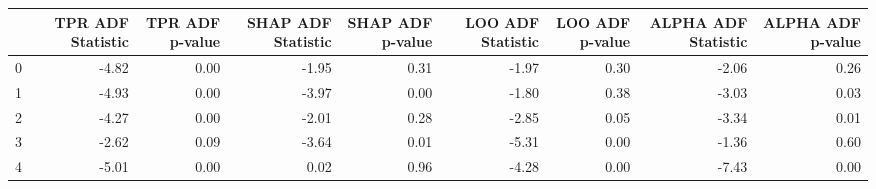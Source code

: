 \begin{tabular}{lrrrrrrrr}
\toprule
 & TPR ADF Statistic & TPR ADF p-value & SHAP ADF Statistic & SHAP ADF p-value & LOO ADF Statistic & LOO ADF p-value & ALPHA ADF Statistic & ALPHA ADF p-value \\
\midrule
0 & -4.82 & 0.00 & -1.95 & 0.31 & -1.97 & 0.30 & -2.06 & 0.26 \\
1 & -4.93 & 0.00 & -3.97 & 0.00 & -1.80 & 0.38 & -3.03 & 0.03 \\
2 & -4.27 & 0.00 & -2.01 & 0.28 & -2.85 & 0.05 & -3.34 & 0.01 \\
3 & -2.62 & 0.09 & -3.64 & 0.01 & -5.31 & 0.00 & -1.36 & 0.60 \\
4 & -5.01 & 0.00 & 0.02 & 0.96 & -4.28 & 0.00 & -7.43 & 0.00 \\
\bottomrule
\end{tabular}
